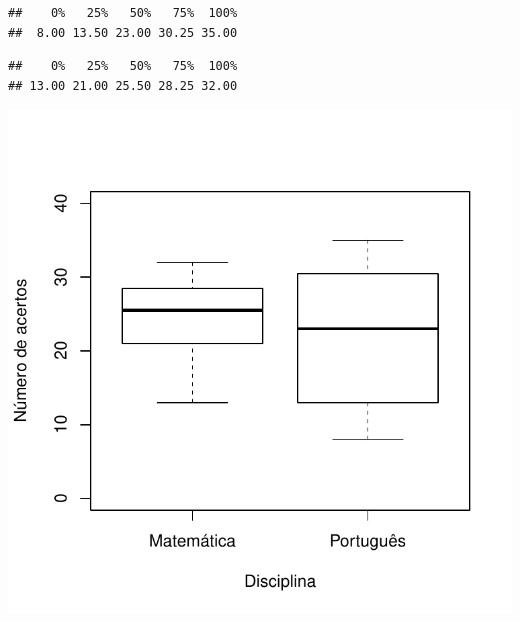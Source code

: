 \documentclass[]{article}
\newenvironment{Shaded}{\begin{snugshade}}{\end{snugshade}}
\newcommand{\KeywordTok}[1]{\textcolor[rgb]{0.13,0.29,0.53}{\textbf{#1}}}
\newcommand{\DataTypeTok}[1]{\textcolor[rgb]{0.13,0.29,0.53}{#1}}
\newcommand{\DecValTok}[1]{\textcolor[rgb]{0.00,0.00,0.81}{#1}}
\newcommand{\StringTok}[1]{\textcolor[rgb]{0.31,0.60,0.02}{#1}}
\newcommand{\CommentTok}[1]{\textcolor[rgb]{0.56,0.35,0.01}{\textit{#1}}}
\newcommand{\OperatorTok}[1]{\textcolor[rgb]{0.81,0.36,0.00}{\textbf{#1}}}
\newcommand{\NormalTok}[1]{#1}
\begin{document}
\begin{verbatim}
##    0%   25%   50%   75%  100% 
##  8.00 13.50 23.00 30.25 35.00
\end{verbatim}

\begin{Shaded}
\end{Shaded}

\begin{verbatim}
##    0%   25%   50%   75%  100% 
## 13.00 21.00 25.50 28.25 32.00
\end{verbatim}

\begin{Shaded}
\end{Shaded}

\includegraphics{Lista_2_Gabarito_files/figure-latex/unnamed-chunk-2-1.pdf}
\end{document}
